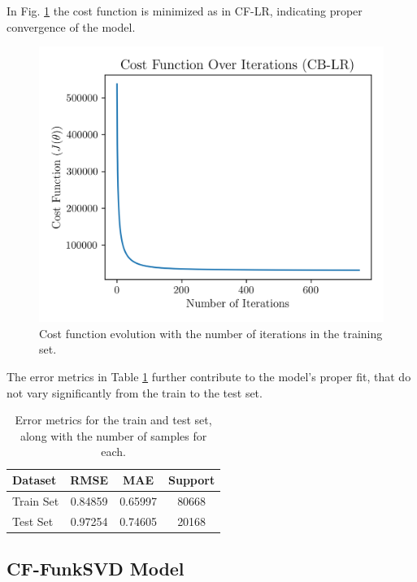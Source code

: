 \documentclass[conference]{IEEEtran}
\begin{document}
In Fig. \ref{fig:model02_cost_function} the cost function is minimized as in CF-LR, indicating proper convergence of the model.

\begin{figure}[H]
    \centering
    \includegraphics[width=1\linewidth]{assets/model02_cost_function.png}
    \caption{Cost function evolution with the number of iterations in the training set.}
    \label{fig:model02_cost_function}
\end{figure}

The error metrics in Table \ref{tab:model03_results} further contribute to the model's proper fit, that do not vary significantly from the train to the test set.

\begin{table}[H]
\centering
\caption{Error metrics for the train and test set, along with the number of samples for each.}
\label{tab:model03_results}
\begin{tabular}{lccc}
\toprule
\textbf{Dataset} & \textbf{RMSE} & \textbf{MAE} & \textbf{Support} \\
\midrule
Train Set & 0.84859 & 0.65997 & 80668 \\
Test Set & 0.97254 & 0.74605 & 20168 \\
\bottomrule
\end{tabular}
\end{table}

\newpage
\subsection{CF-FunkSVD Model}
\end{document}
